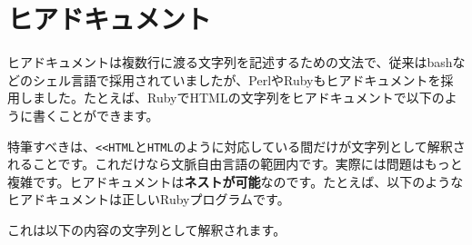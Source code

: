\hypertarget{chapter7-ux30d2ux30a2ux30c9ux30adux30e5ux30e1ux30f3ux30c8}{%
\section{ヒアドキュメント}\label{chapter7-ux30d2ux30a2ux30c9ux30adux30e5ux30e1ux30f3ux30c8}}

ヒアドキュメントは複数行に渡る文字列を記述するための文法で、従来はbashなどのシェル言語で採用されていましたが、PerlやRubyもヒアドキュメントを採用しました。たとえば、RubyでHTMLの文字列をヒアドキュメントで以下のように書くことができます。

\begin{Shaded}
\begin{Highlighting}[]
\end{Highlighting}
\end{Shaded}

特筆すべきは、\texttt{\textless{}\textless{}HTML}と\texttt{HTML}のように対応している間だけが文字列として解釈されることです。これだけなら文脈自由言語の範囲内です。実際には問題はもっと複雑です。ヒアドキュメントは\textbf{ネストが可能}なのです。たとえば、以下のようなヒアドキュメントは正しいRubyプログラムです。

\begin{Shaded}
\begin{Highlighting}[]
\end{Highlighting}
\end{Shaded}

これは以下の内容の文字列として解釈されます。

\begin{Shaded}
\begin{Highlighting}[]
\end{Highlighting}
\end{Shaded}

